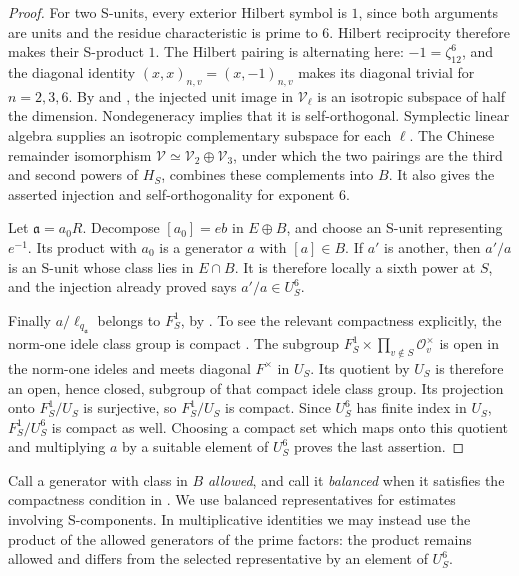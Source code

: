 \begin{proof}
For two S-units, every exterior Hilbert symbol is \(1\), since both arguments
are units and the residue characteristic is prime to \(6\).  Hilbert
reciprocity \cite[Chapter~VI, Theorem~(8.1)]{Neukirch99} therefore makes
their S-product \(1\).  The Hilbert pairing is
alternating here: \(-1=\zeta_{12}^6\), and the diagonal identity
\((x,x)_{n,v}=(x,-1)_{n,v}\) makes its diagonal trivial for \(n=2,3,6\).
By  and , the
injected unit image in \(\mathcal V_\ell\) is an isotropic subspace of half
the dimension.  Nondegeneracy implies that it is self-orthogonal.
Symplectic linear algebra supplies an isotropic complementary subspace for
each \(\ell\).  The Chinese remainder isomorphism
\(\mathcal V\simeq\mathcal V_2\oplus\mathcal V_3\), under which the two
pairings are the third and second powers of \(H_S\), combines these
complements into \(B\).  It also gives the asserted injection and
self-orthogonality for exponent \(6\).

Let \(\mathfrak a=a_0R\).  Decompose \([a_0]=e b\) in \(E\oplus B\), and
choose an S-unit representing \(e^{-1}\).  Its product with \(a_0\) is a
generator \(a\) with \([a]\in B\).  If \(a'\) is another, then \(a'/a\) is
an S-unit whose class lies in \(E\cap B\).  It is therefore locally a sixth
power at \(S\), and the injection already proved says \(a'/a\in U_S^6\).

Finally \(a/\ell_{q_{\mathfrak a}}\) belongs to \(F_S^1\), by
.  To see the relevant compactness explicitly, the
norm-one idele class group is compact
\cite[Chapter~VI, Theorem~(1.6)]{Neukirch99}.  The subgroup
\(F_S^1\times\prod_{v\notin S}\mathcal O_v^\times\) is open in the
norm-one ideles and meets diagonal \(F^\times\) in \(U_S\).  Its quotient
by \(U_S\) is therefore an open, hence closed, subgroup of that compact
idele class group.  Its projection onto \(F_S^1/U_S\) is surjective, so
\(F_S^1/U_S\) is compact.  Since \(U_S^6\) has finite index in \(U_S\),
\(F_S^1/U_S^6\) is compact as well.  Choosing a compact set which maps onto
this quotient and multiplying \(a\) by a suitable element of \(U_S^6\)
proves the last assertion.
\end{proof}

Call a generator with class in \(B\) \emph{allowed}, and call it
\emph{balanced} when it satisfies the compactness condition in
.  We use balanced representatives for
estimates involving S-components.  In multiplicative identities we may
instead use the product of the allowed generators of the prime factors:
the product remains allowed and differs from the selected representative by
an element of \(U_S^6\).

